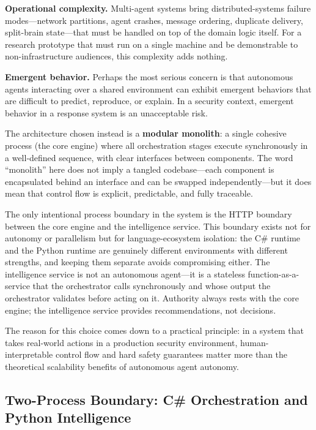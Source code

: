 \textbf{Operational complexity.} Multi-agent systems bring distributed-systems
failure modes---network partitions, agent crashes, message ordering, duplicate delivery,
split-brain state---that must be handled on top of the domain logic itself. For
a research prototype that must run on a single machine and be demonstrable to
non-infrastructure audiences, this complexity adds nothing.

\textbf{Emergent behavior.} Perhaps the most serious concern is that autonomous agents
interacting over a shared environment can exhibit emergent behaviors that are difficult
to predict, reproduce, or explain. In a security context, emergent behavior in a
response system is an unacceptable risk.

The architecture chosen instead is a \textbf{modular monolith}: a single cohesive
process (the core engine) where all orchestration stages execute synchronously in
a well-defined sequence, with clear interfaces between components. The word ``monolith''
here does not imply a tangled codebase---each component is encapsulated behind an
interface and can be swapped independently---but it does mean that control flow is
explicit, predictable, and fully traceable.

The only intentional process boundary in the system is the HTTP boundary between the
core engine and the intelligence service. This boundary exists not for autonomy or
parallelism but for language-ecosystem isolation: the C\# runtime and the Python
runtime are genuinely different environments with different strengths, and keeping
them separate avoids compromising either. The intelligence service is not an
autonomous agent---it is a stateless function-as-a-service that the orchestrator
calls synchronously and whose output the orchestrator validates before acting on it.
Authority always rests with the core engine; the intelligence service provides
recommendations, not decisions.

The reason for this choice comes down to a practical principle: in a system that takes
real-world actions in a production security environment, human-interpretable control
flow and hard safety guarantees matter more than the theoretical scalability benefits
of autonomous agent autonomy.

\subsection{Two-Process Boundary: C\# Orchestration and Python Intelligence}

